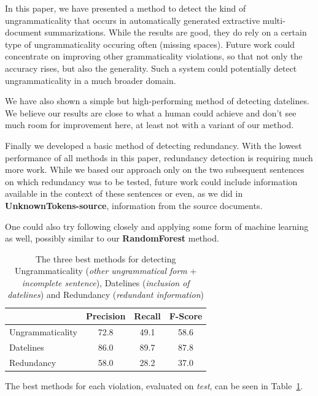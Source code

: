 \documentclass[a4paper,10pt]{scrartcl}
\theoremstyle{style}
\begin{document}
In this paper, we have presented a method to detect the kind of ungrammaticality that occurs in automatically generated extractive multi-document summarizations. While the results are good, they do rely on a certain type of ungrammaticality occuring often (missing spaces). Future work could concentrate on improving other grammaticality violations, so that not only the accuracy rises, but also the generality. Such a system could potentially detect ungrammaticality in a much broader domain.

We have also shown a simple but high-performing method of detecting datelines. We believe our results are close to what a human could achieve and don't see much room for improvement here, at least not with a variant of our method.

Finally we developed a basic method of detecting redundancy. With the lowest performance of all methods in this paper, redundancy detection is requiring much more work. While we based our approach only on the two subsequent sentences on which redundancy was to be tested, future work could include information available in the context of these sentences or even, as we did in \textbf{UnknownTokens-source}, information from the source documents.

One could also try following \cite{hatzivassiloglou1999detecting} closely and applying some form of machine learning as well, possibly similar to our \textbf{RandomForest} method.

\begin{table}
\begin{center}
\begin{tabular}{|l|c|c|c|}
  \hline
   & Precision & Recall & F-Score\\
  \hline
  Ungrammaticality & 72.8 & 49.1 & 58.6\\
  \hline
  Datelines & 86.0 & 89.7 & 87.8\\
  \hline
  Redundancy & 58.0 & 28.2 & 37.0\\
  \hline
  \end{tabular}
\end{center}
\label{eval_best}
\caption{The three best methods for detecting Ungrammaticality (\textit{other ungrammatical form} + \textit{incomplete sentence}), Datelines (\textit{inclusion of datelines}) and Redundancy (\textit{redundant information})}
\end{table}

The best methods for each violation, evaluated on \textit{test}, can be seen in Table~\ref{eval_best}.
\end{document}

